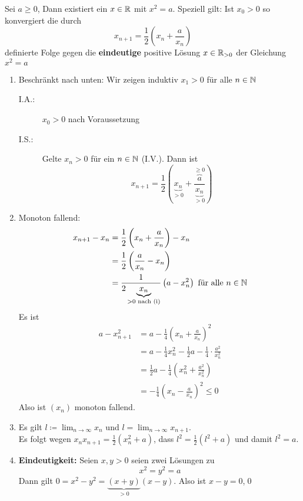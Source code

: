 \begin{subcorollary}
	Sei $ a\geq 0 $, Dann existiert ein $  x \in \mathbb{R} $ mit $ x^2 = a $. Speziell gilt:
	Ist $ x_0 > 0 $ so konvergiert die durch
	\[ x_{n+1} = \frac{1}{2} \left( x_n + \frac{a}{x_n} \right) \]
	definierte Folge gegen die \textbf{eindeutige} positive Lösung $ x \in \mathbb{R}_{>0} $ der Gleichung $ x^2 = a $
	\begin{subproof*}
		\begin{enumerate}[label=(\roman*)]
			\item Beschränkt nach unten: Wir zeigen induktiv $ x_1 > 0 $ für alle $ n \in \mathbb{N} $
				\begin{description}
					\item[I.A.:] $ x_0 > 0 $ nach Voraussetzung
					\item[I.S.:] Gelte $ x_n > 0 $ für ein $ n \in \mathbb{N} $ (I.V.). Dann ist
						\[ x_{n+1} = \frac{1}{2} \left( \underbrace{x_n}_{>0} + \frac{\overbrace{a}^{\geq0}}{\underbrace{x_n}_{>0}} \right) \]
				\end{description}
			\item Monoton fallend: 
				\begin{align*}
					x_{n+1} - x_n &= \frac{1}{2} \left( x_n + \frac{a}{x_n} \right) - x_n\\
					~&= \frac{1}{2} \left( \frac{a}{x_n} - x_n \right)\\
					~&= \frac{1}{2\underbrace{x_n}_{>0 \text{ nach (i)}}} \left( a - x_n^2 \right) \text{ für alle } n \in \mathbb{N}
				\end{align*}
				Es ist
				\begin{align*}
					a- x_{n+1}^{2} &= a - \frac{1}{4} \left( x_n + \frac{a}{x_n} \right)^2\\
					~&= a - \frac{1}{4}x_n^2 - \frac{1}{2} a - \frac{1}{4} \cdot \frac{a^2}{x_n^2}\\
					~&= \frac{1}{2}a - \frac{1}{4}\left(x_n^2 + \frac{a^2}{x_n^2}\right)\\
					~&= - \frac{1}{4} \left( x_n - \frac{a}{x_n} \right)^2 \leq 0
				\end{align*}
				Also ist $(x_n)$ monoton fallend.
			\item Es gilt $ l \coloneqq \lim_{n\to\infty} x_n $ und $ l = \lim_{n\to\infty} x_{n+1} $.\\
				Es folgt wegen $ x_n x_{n+1} = \frac{1}{2} \left( x_n^2 + a \right) $, dass $ l^2 = \frac{1}{2} \left( l^2 + a \right) $ und damit $ l^2 = a $.
			\item \textbf{Eindeutigkeit:} Seien $ x, y > 0 $ seien zwei Lösungen zu
				\[ x^2 = y^2 = a \]
				Dann gilt $ 0 = x^2 - y^2 = \underbrace{(x+y)}_{>0}(x-y) $. Also ist $ x - y = 0 $,\qed
		\end{enumerate}
	\end{subproof*}
\end{subcorollary}

